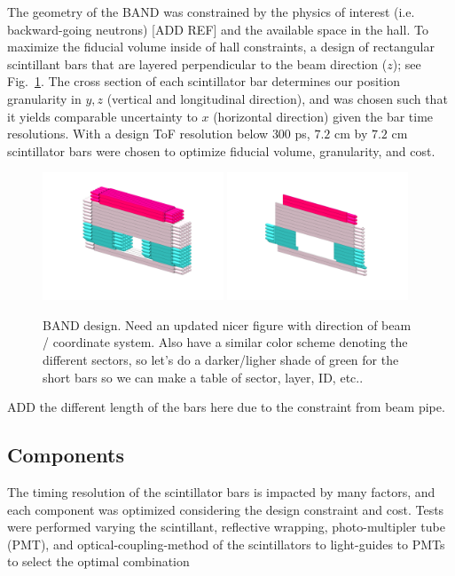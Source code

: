 \documentclass[3p,final,twocolumn]{elsarticle}
\begin{document}
The geometry of the BAND was constrained by the physics of interest (i.e. backward-going neutrons) [ADD REF] and the available space in the hall. To
maximize the fiducial volume inside of hall constraints, a design of rectangular scintillant bars that are layered perpendicular to the beam direction ($z$); see Fig.~\ref{fig:design}.
The cross section of each scintillator bar determines our position granularity in $y,z$ (vertical and longitudinal direction), and was chosen such that it yields comparable uncertainty to $x$ (horizontal direction) given the bar 
time resolutions. With a design ToF resolution below $300$ \si{\pico\second}, $7.2$ \si{\centi\meter} by $7.2$ \si{\centi\meter} scintillator bars were chosen to optimize
fiducial volume, granularity, and cost.
\begin{figure}[h]
	\centering
		\includegraphics[width=0.48\textwidth]{MAIN_DETECTOR_COLORED_2.png}
		\includegraphics[width=0.48\textwidth]{VETO_DETECTOR_COLORED_2.png}
		\caption{BAND design. Need an updated nicer figure with direction of beam / coordinate system. Also have a similar 
		color scheme denoting the different sectors, so let's do a darker/ligher shade of green for the short bars so we can make 
		a table of sector, layer, ID, etc..}
		\label{fig:design}
\end{figure}

{\color{red} ADD the different length of the bars here due to the constraint from beam pipe.}

\subsection{Components}
The timing resolution of the scintillator bars is impacted by many factors, and each component was optimized considering the design constraint and cost. Tests were 
performed varying the scintillant, reflective wrapping, photo-multipler tube (PMT), and optical-coupling-method of the scintillators to light-guides to PMTs to select the optimal combination
\end{document}

